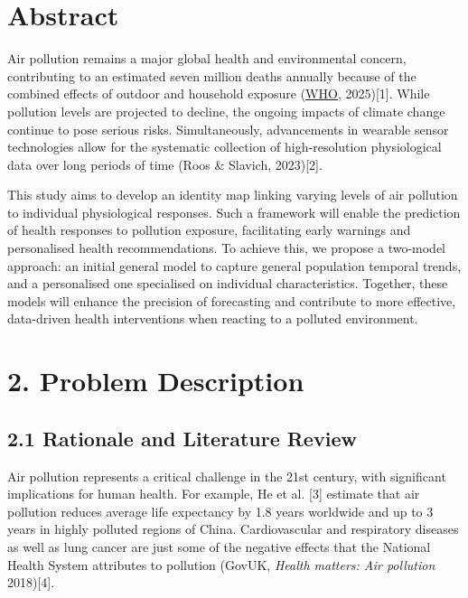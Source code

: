 \documentclass[
]{article}
\begin{document}
\hypertarget{abstract}{%
\section{\texorpdfstring{Abstract }{Abstract }}\label{abstract}}

Air pollution remains a major global health and environmental concern,
contributing to an estimated seven million deaths annually because of
the combined effects of outdoor and household exposure
(\href{https://www.who.int/health-topics/air-pollution\#tab=tab_2}{WHO,}
2025){[}1{]}. While pollution levels are projected to decline, the
ongoing impacts of climate change continue to pose serious risks.
Simultaneously, advancements in wearable sensor technologies allow for
the systematic collection of high-resolution physiological data over
long periods of time (Roos \& Slavich, 2023){[}2{]}.

This study aims to develop an identity map linking varying levels of air
pollution to individual physiological responses. Such a framework will
enable the prediction of health responses to pollution exposure,
facilitating early warnings and personalised health recommendations. To
achieve this, we propose a two-model approach: an initial general model
to capture general population temporal trends, and a personalised one
specialised on individual characteristics. Together, these models will
enhance the precision of forecasting and contribute to more effective,
data-driven health interventions when reacting to a polluted
environment.

\hypertarget{problem-description}{%
\section{\texorpdfstring{2. Problem Description
}{2. Problem Description }}\label{problem-description}}

\hypertarget{rationale-and-literature-review}{%
\subsection{2.1 Rationale and Literature
Review}\label{rationale-and-literature-review}}

Air pollution represents a critical challenge in the 21st century, with
significant implications for human health. For example, He et al.
{[}3{]} estimate that air pollution reduces average life expectancy by
1.8 years worldwide and up to 3 years in highly polluted regions of
China. Cardiovascular and respiratory diseases as well as lung cancer
are just some of the negative effects that the National Health System
attributes to pollution (GovUK, \emph{Health matters: Air pollution}
2018){[}4{]}.
\end{document}
